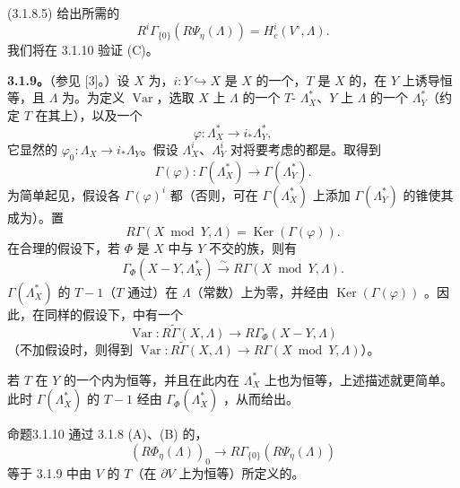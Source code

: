  (3.1.8.5) 给出所需的
\[
 R^i\Gamma_{\{0\}}(R\Psi_\eta(\Lambda))=H_c^i(V^\circ,\Lambda).\tag{3.1.8.6}
\]
我们将在 3.1.10 验证 (C)。

\textbf{3.1.9。}（参见 [3]。）设 $X$ 为，$i:Y\hookrightarrow X$ 是 $X$ 的一个，$T$ 是 $X$ 的，在 $Y$ 上诱导恒等，且 $\Lambda$ 为。为定义 $\operatorname{Var}$，选取 $X$ 上 $\Lambda$ 的一个 $T$- $\Lambda_X^*$、$Y$ 上 $\Lambda$ 的一个 $\Lambda_Y^*$（约定 $T$ 在其上），以及一个
\[
 \varphi:\Lambda_X^*\longrightarrow i_*\Lambda_Y^*,
\]
它显然的 $\varphi_0:\Lambda_X\to i_*\Lambda_Y$。假设 $\Lambda_X^i$、$\Lambda_Y^i$ 对将要考虑的都是。取得到
\[
 \Gamma(\varphi):\Gamma(\Lambda_X^*)\longrightarrow\Gamma(\Lambda_Y^*).
\]
为简单起见，假设各 $\Gamma(\varphi)^i$ 都（否则，可在 $\Gamma(\Lambda_X^*)$ 上添加 $\Gamma(\Lambda_Y^*)$ 的锥使其成为）。置
\[
 R\Gamma(X\bmod Y,\Lambda)=\operatorname{Ker}(\Gamma(\varphi)).
\]
在合理的假设下，若 $\Phi$ 是 $X$ 中与 $Y$ 不交的族，则有
\[
 \Gamma_\Phi(X-Y,\Lambda_X^*)\xrightarrow{\sim}R\Gamma(X\bmod Y,\Lambda).
\]
$\Gamma(\Lambda_X^*)$ 的 $T-1$（$T$ 通过）在 $\Lambda$（常数）上为零，并经由 $\operatorname{Ker}(\Gamma(\varphi))$ 。因此，在同样的假设下，中有一个
\[
 \operatorname{Var}:R\widetilde\Gamma(X,\Lambda)\longrightarrow R\Gamma_\Phi(X-Y,\Lambda)
\]
（不加假设时，则得到 $\operatorname{Var}:R\widetilde\Gamma(X,\Lambda)\to R\Gamma(X\bmod Y,\Lambda)$）。

若 $T$ 在 $Y$ 的一个内为恒等，并且在此内在 $\Lambda_X^*$ 上也为恒等，上述描述就更简单。此时 $\Gamma(\Lambda_X^*)$ 的 $T-1$ 经由 $\Gamma_\Phi(\Lambda_X^*)$ ，从而给出。

\begin{SGAresult}{命题}{3.1.10}
通过 3.1.8 (A)、(B) 的，
\[
 (R\Phi_\eta(\Lambda))_0\longrightarrow R\Gamma_{\{0\}}(R\Psi_\eta(\Lambda))
\]
等于 3.1.9 中由 $V$ 的 $T$（在 $\partial V$ 上为恒等）所定义的。
\end{SGAresult}


